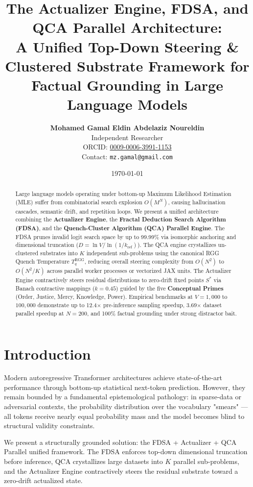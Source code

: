 \documentclass[11pt,a4paper]{article}
\title{\textbf{The Actualizer Engine, FDSA, and QCA Parallel Architecture:\\
A Unified Top-Down Steering \& Clustered Substrate Framework for Factual Grounding in Large Language Models}}
\author{
  \textbf{Mohamed Gamal Eldin Abdelaziz Noureldin}\\
  Independent Researcher\\
  ORCID: \href{https://orcid.org/0009-0006-3991-1153}{0009-0006-3991-1153}\\
  Contact: \texttt{mz.gamal@gmail.com}
}
\date{\today}
\begin{document}
\maketitle

\begin{abstract}
Large language models operating under bottom-up Maximum Likelihood Estimation (MLE) suffer from combinatorial search explosion $O(M^N)$, causing hallucination cascades, semantic drift, and repetition loops. We present a unified architecture combining the \textbf{Actualizer Engine}, the \textbf{Fractal Deduction Search Algorithm (FDSA)}, and the \textbf{Quench-Cluster Algorithm (QCA) Parallel Engine}. The FDSA prunes invalid logit search space by up to 99.99\% via isomorphic anchoring and dimensional truncation ($D = \ln V / \ln(1/k_{\text{ref}})$). The QCA engine crystallizes un-clustered substrates into $K$ independent sub-problems using the canonical RGG Quench Temperature $T_q^{\text{RGG}}$, reducing overall steering complexity from $O(N^2)$ to $O(N^2/K)$ across parallel worker processes or vectorized JAX units. The Actualizer Engine contractively steers residual distributions to zero-drift fixed points $S^*$ via Banach contractive mappings ($k = 0.45$) guided by the five \textbf{Conceptual Primes} (Order, Justice, Mercy, Knowledge, Power). Empirical benchmarks at $V = 1,000$ to $100,000$ demonstrate up to 12.4$\times$ pre-inference sampling speedup, 3.69$\times$ dataset parallel speedup at $N=200$, and 100\% factual grounding under strong distractor bait.
\end{abstract}

\section{Introduction}
Modern autoregressive Transformer architectures achieve state-of-the-art performance through bottom-up statistical next-token prediction. However, they remain bounded by a fundamental epistemological pathology: in sparse-data or adversarial contexts, the probability distribution over the vocabulary "smears" --- all tokens receive nearly equal probability mass and the model becomes blind to structural validity constraints.

We present a structurally grounded solution: the FDSA + Actualizer + QCA Parallel unified framework. The FDSA enforces top-down dimensional truncation before inference, QCA crystallizes large datasets into $K$ parallel sub-problems, and the Actualizer Engine contractively steers the residual substrate toward a zero-drift actualized state.
\end{document}
